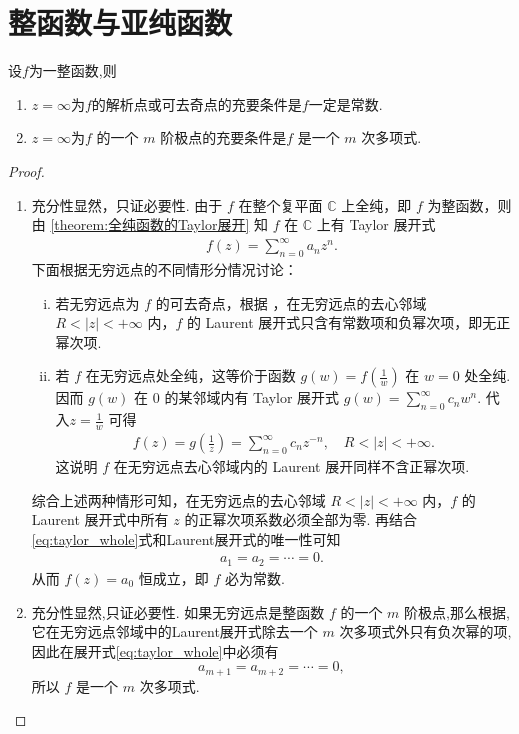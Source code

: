 \documentclass[../../main.tex]{subfiles}%
\begin{document}
\section{整函数与亚纯函数}

\begin{theorem}\label{theorem:定理5.3.1}
设$f$为一整函数,则
\begin{enumerate}[(1)]
\item\label{theorem:定理5.3.1-1} $z = \infty$为$f$的解析点或可去奇点的充要条件是$f$一定是常数.

\item\label{theorem:定理5.3.1-2} $z = \infty$为\( f \) 的一个 \( m \) 阶极点的充要条件是\( f \) 是一个 \( m \) 次多项式.
\end{enumerate}
\end{theorem}
\begin{proof}
\begin{enumerate}[(1)]
\item 充分性显然，只证必要性.
由于 \(f\) 在整个复平面 \(\mathbb{C}\) 上全纯，即 \(f\) 为整函数，则由 \cref{theorem:全纯函数的Taylor展开} 知 \(f\) 在 \(\mathbb{C}\) 上有 Taylor 展开式
\begin{align}
f(z) = \sum_{n = 0}^{\infty} a_n z^n. \label{eq:taylor_whole}
\end{align}
下面根据无穷远点的不同情形分情况讨论：
\begin{enumerate}[(i)]
\item 若无穷远点为 \(f\) 的可去奇点，根据 ，在无穷远点的去心邻域 \(R<|z|<+\infty\) 内，\(f\) 的 Laurent 展开式只含有常数项和负幂次项，即无正幂次项.
\item 若 \(f\) 在无穷远点处全纯，这等价于函数 \(g(w)=f\left(\frac{1}{w}\right)\) 在 \(w=0\) 处全纯. 因而 \(g(w)\) 在 \(0\) 的某邻域内有 Taylor 展开式 \(g(w)=\sum_{n=0}^{\infty} c_n w^n\). 代入\(z=\frac{1}{w}\) 可得
\begin{align*}
f(z)=g\left( \frac{1}{z} \right) =\sum_{n=0}^{\infty}{c_nz^{-n}},\quad R<|z|<+\infty .
\end{align*}
这说明 \(f\) 在无穷远点去心邻域内的 Laurent 展开同样不含正幂次项.
\end{enumerate}
综合上述两种情形可知，在无穷远点的去心邻域 \(R<|z|<+\infty\) 内，\(f\) 的 Laurent 展开式中所有 \(z\) 的正幂次项系数必须全部为零. 再结合\eqref{eq:taylor_whole}式和Laurent展开式的唯一性可知
\begin{align*}
a_1 = a_2 = \cdots = 0.
\end{align*}
从而 \(f(z) = a_0\) 恒成立，即 \(f\) 必为常数.

\item 充分性显然,只证必要性.
如果无穷远点是整函数 \( f \) 的一个 \( m \) 阶极点,那么根据,它在无穷远点邻域中的Laurent展开式除去一个 \( m \) 次多项式外只有负次幂的项,因此在展开式\eqref{eq:taylor_whole}中必须有
\[
a_{m + 1} = a_{m + 2} = \cdots = 0,
\]
所以 \( f \) 是一个 \( m \) 次多项式.

\end{enumerate}
\end{proof}
\end{document}
